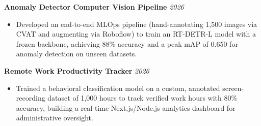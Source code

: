 \documentclass[11pt, a4paper]{article}
\begin{document}
\textbf{Anomaly Detector Computer Vision Pipeline} \hfill \textit{2026}
\begin{itemize}[leftmargin=0.25in, itemsep=2pt]
    \item Developed an end-to-end MLOps pipeline (hand-annotating 1,500 images via CVAT and augmenting via Roboflow) to train an RT-DETR-L model with a frozen backbone, achieving 88\% accuracy and a peak mAP of 0.650 for anomaly detection on unseen datasets.
\end{itemize}

\textbf{Remote Work Productivity Tracker} \hfill \textit{2026}
\begin{itemize}[leftmargin=0.25in, itemsep=2pt]
    \item Trained a behavioral classification model on a custom, annotated screen-recording dataset of 1,000 hours to track verified work hours with 80\% accuracy, building a real-time Next.js/Node.js analytics dashboard for administrative oversight.
\end{itemize}
\end{document}
